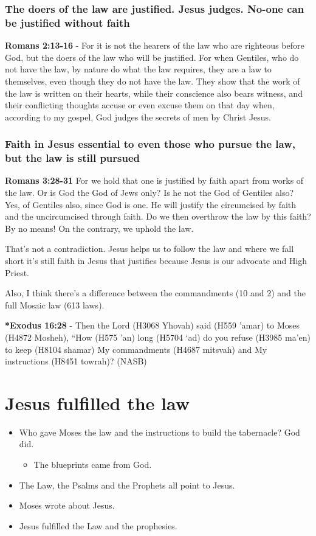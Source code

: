 \documentclass[11pt]{article}
\begin{document}
\subsubsection{The doers of the law are justified. Jesus judges. No-one can be justified without faith}
\label{sec:orgacdc95a}
\textbf{Romans 2:13-16} - For it is not the hearers of the law who are righteous before God, but the doers of the law who will be justified.  For when Gentiles, who do not have the law, by nature do what the law requires, they are a law to themselves, even though they do not have the law.  They show that the work of the law is written on their hearts, while their conscience also bears witness, and their conflicting thoughts accuse or even excuse them on that day when, according to my gospel, God judges the secrets of men by Christ Jesus.

\subsubsection{Faith in Jesus essential to even those who pursue the law, but the law is still pursued}
\label{sec:orgb97efc9}
\textbf{Romans 3:28-31} For we hold that one is justified by faith apart from works of the law.  Or is God the God of Jews only? Is he not the God of Gentiles also? Yes, of Gentiles also, since God is one. He will justify the circumcised by faith and the uncircumcised through faith.  Do we then overthrow the law by this faith? By no means! On the contrary, we uphold the law.

That's not a contradiction.
Jesus helps us to follow the law and where we fall short it's still faith in Jesus that justifies because Jesus is our advocate and High Priest.

Also, I think there's a difference between the commandments (10 and 2) and the full Mosaic law (613 laws).

\textbf{*Exodus 16:28} - Then the Lord (H3068 Yhovah) said (H559 'amar) to Moses (H4872 Mosheh), “How (H575 'an) long (H5704 `ad) do you refuse (H3985 ma'en) to keep (H8104 shamar) My commandments (H4687 mitsvah) and My instructions (H8451 towrah)? (NASB)

\section{Jesus fulfilled the law}
\label{sec:org94e9005}
\begin{itemize}
\item Who gave Moses the law and the instructions to build the tabernacle? God did.
\begin{itemize}
\item The blueprints came from God.
\end{itemize}
\item The Law, the Psalms and the Prophets all point to Jesus.
\item Moses wrote about Jesus.
\item Jesus fulfilled the Law and the prophesies.
\end{itemize}
\end{document}
